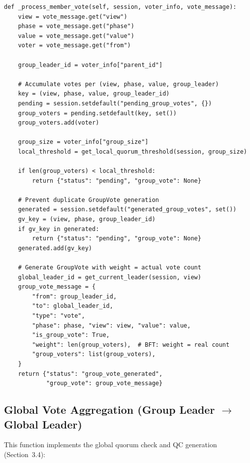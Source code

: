 \documentclass[12pt,a4paper]{article}
\begin{document}
\begin{lstlisting}[caption={Local vote aggregation (\texttt{consensus\_service.py})}, label=lst:local]
def _process_member_vote(self, session, voter_info, vote_message):
    view = vote_message.get("view")
    phase = vote_message.get("phase")
    value = vote_message.get("value")
    voter = vote_message.get("from")

    group_leader_id = voter_info["parent_id"]

    # Accumulate votes per (view, phase, value, group_leader)
    key = (view, phase, value, group_leader_id)
    pending = session.setdefault("pending_group_votes", {})
    group_voters = pending.setdefault(key, set())
    group_voters.add(voter)

    group_size = voter_info["group_size"]
    local_threshold = get_local_quorum_threshold(session, group_size)

    if len(group_voters) < local_threshold:
        return {"status": "pending", "group_vote": None}

    # Prevent duplicate GroupVote generation
    generated = session.setdefault("generated_group_votes", set())
    gv_key = (view, phase, group_leader_id)
    if gv_key in generated:
        return {"status": "pending", "group_vote": None}
    generated.add(gv_key)

    # Generate GroupVote with weight = actual vote count
    global_leader_id = get_current_leader(session, view)
    group_vote_message = {
        "from": group_leader_id,
        "to": global_leader_id,
        "type": "vote",
        "phase": phase, "view": view, "value": value,
        "is_group_vote": True,
        "weight": len(group_voters),  # BFT: weight = real count
        "group_voters": list(group_voters),
    }
    return {"status": "group_vote_generated",
            "group_vote": group_vote_message}
\end{lstlisting}

\subsection{Global Vote Aggregation (Group Leader $\to$ Global Leader)}

This function implements the global quorum check and QC generation (Section~3.4):
\end{document}
